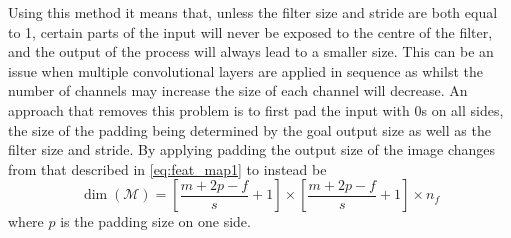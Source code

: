 \documentclass[12pt]{article}
\numberwithin{equation}{section}
\numberwithin{figure}{section}
\begin{document}
Using this method it means that, unless the filter size and stride are both equal to 1, certain parts of the input will never be exposed to the centre of the filter, and the output of the process will always lead to a smaller size. This can be an issue when multiple convolutional layers are applied in sequence as whilst the number of channels may increase the size of each channel will decrease. An approach that removes this problem is to first pad the input with 0s on all sides, the size of the padding being determined by the goal output size as well as the filter size and stride. By applying padding the output size of the image changes from that described in \cref{eq:feat_map1} to instead be
\begin{equation}
	\label{eq:feat_map2}
	\dim(\mathscr{M}) = \left[\frac{m+2p-f}{s} +1 \right] \times \left[\frac{m+2p-f}{s} +1 \right] \times n_{f}
\end{equation}
where $p$ is the padding size on one side.
\end{document}
